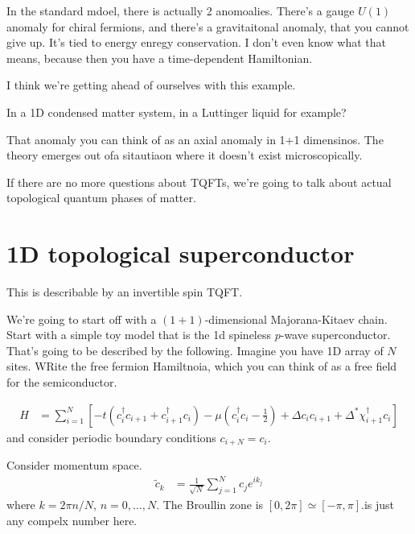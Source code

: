 In the standard mdoel,
there is actually 2 anomoalies.
There's a gauge $U(1)$ anomaly for chiral fermions,
and there's a gravitaitonal anomaly,
that you cannot give up.
It's tied to energy enregy conservation.
I don't even know what that means,
because then you have a time-dependent Hamiltonian.

I think we're getting ahead of ourselves with this example.

\begin{question}
    In a 1D condensed matter system,
    in a Luttinger liquid for example?
\end{question}
That anomaly you can think of as an axial anomaly in 1+1 dimensinos.
The theory emerges out ofa sitautiaon where it doesn't exist microscopically.

If there are no more questions about TQFTs,
we're going to talk about actual topological quantum phases of matter.

\section{1D topological superconductor}
This is describable by an invertible spin TQFT.

We're going to start off with a $(1+1)$-dimensional
Majorana-Kitaev chain.
Start with a simple toy model that is the 1d spineless $p$-wave superconductor.
That's going to be described by the following.
Imagine you have 1D array of $N$ sites.
WRite the free fermion Hamiltnoia,
which you can think of as a free field for the semiconductor.

\begin{align}
    H &=
    \sum_{i=1}^{N}
    \left[ 
    -t\left( c_i^\dagger c_{i+1} + c_{i+1}^\dagger c_i\right)
    - \mu\left( c_i^\dagger c_i - \frac{1}{2} \right)
    + \Delta c_i c_{i+1}
    + \Delta^* \chi_{i+1}^\dagger c_i
    \right]
\end{align}
and consider periodic boundary conditions $c_{i+N}=c_i$.

Consider momentum space.
\begin{align}
    \tilde{c}_k &=
    \frac{1}{\sqrt{N}}
    \sum_{j=1}^{N}
    c_j e^{ik_j}
\end{align}
where $k = 2\pi n/N$,
$n=0,\ldots,N$.
The Broullin zone is $[0,2\pi] \simeq [-\pi, \pi].
$\Delta is just any compelx number here.

